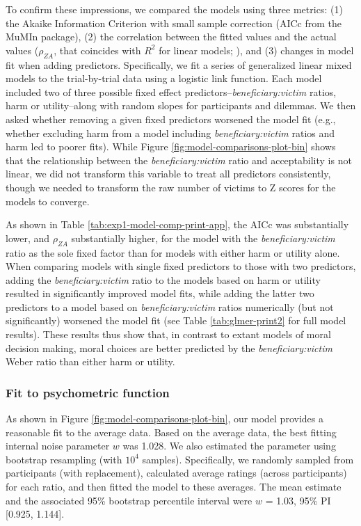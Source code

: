 \documentclass[
]{article}
\begin{document}
To confirm these impressions, we compared the models using three metrics: (1) the Akaike Information Criterion with small sample correction (AICc from the MuMIn package), (2) the correlation between the fitted values and the actual values (\(\rho_{ZA}\), that coincides with \(R^2\) for linear models; \autocite{Zheng2000}), and (3) changes in model fit when adding predictors. Specifically, we fit a series of generalized linear mixed models to the trial-by-trial data using a logistic link function. Each model included two of three possible fixed effect predictors--\emph{beneficiary:victim} ratios, harm or utility--along with random slopes for participants and dilemmas. We then asked whether removing a given fixed predictors worsened the model fit (e.g., whether excluding harm from a model including \emph{beneficiary:victim} ratios and harm led to poorer fits). While Figure \ref{fig:model-comparisons-plot-bin} shows that the relationship between the \emph{beneficiary:victim} ratio and acceptability is not linear, we did not transform this variable to treat all predictors consistently, though we needed to transform the raw number of victims to Z scores for the models to converge.

\clearpage

As shown in Table \ref{tab:exp1-model-comp-print-app}, the AICc was substantially lower, and \(\rho_{ZA}\) substantially higher, for the model with the \emph{beneficiary:victim} ratio as the sole fixed factor than for models with either harm or utility alone. When comparing models with single fixed predictors to those with two predictors, adding the \emph{beneficiary:victim} ratio to the models based on harm or utility resulted in significantly improved model fits, while adding the latter two predictors to a model based on \emph{beneficiary:victim} ratios numerically (but not significantly) worsened the model fit (see Table \ref{tab:glmer-print2} for full model results). These results thus show that, in contrast to extant models of moral decision making, moral choices are better predicted by the \emph{beneficiary:victim} Weber ratio than either harm or utility.

\subsubsection{Fit to psychometric function}\label{fit-to-psychometric-function}

As shown in Figure \ref{fig:model-comparisons-plot-bin}, our model provides a reasonable fit to the average data. Based on the average data, the best fitting internal noise parameter \(w\) was 1.028. We also estimated the parameter using bootstrap resampling (with \ensuremath{10^{4}} samples). Specifically, we randomly sampled from participants (with replacement), calculated average ratings (across participants) for each ratio, and then fitted the model to these averages. The mean estimate and the associated 95\% bootstrap percentile interval \autocite{Hesterberg2015} were \(w\) = 1.03, 95\% PI {[}0.925, 1.144{]}.
\end{document}
